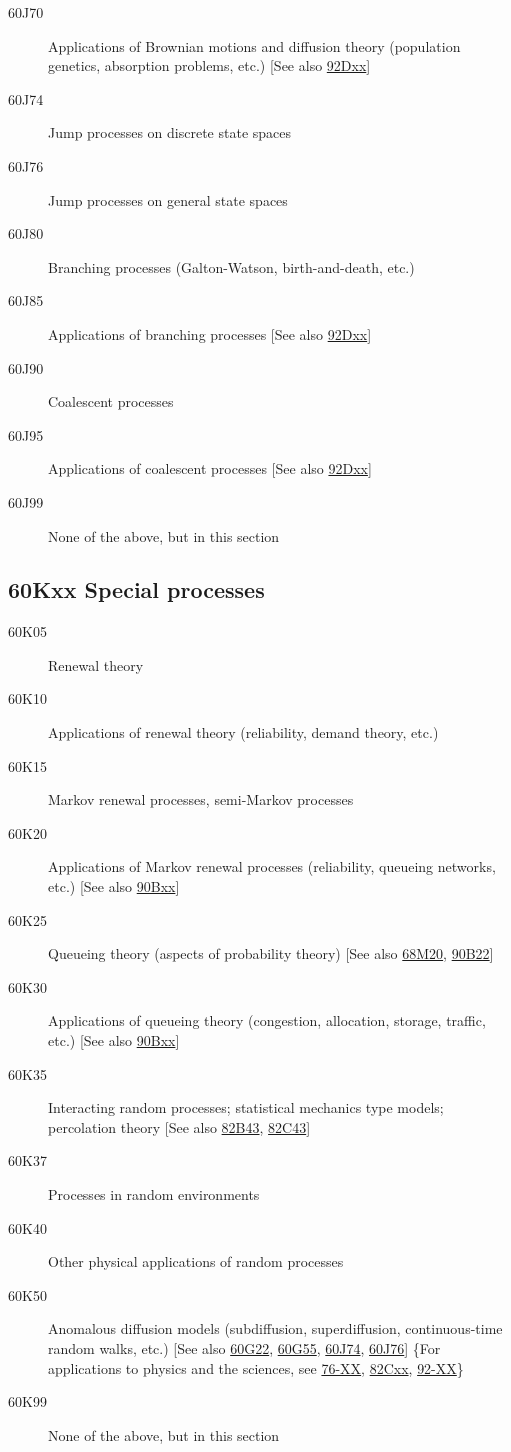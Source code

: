 \begin{description}
\item [60J70]\label{60J70} Applications of Brownian motions and diffusion theory (population genetics, absorption problems, etc.) [See also \hyperref[92Dxx]{92Dxx}]
\item [60J74]\label{60J74} Jump processes on discrete state spaces
\item [60J76]\label{60J76} Jump processes on general state spaces
\item [60J80]\label{60J80} Branching processes (Galton-Watson, birth-and-death, etc.)
\item [60J85]\label{60J85} Applications of branching processes [See also \hyperref[92Dxx]{92Dxx}]
\item [60J90]\label{60J90} Coalescent processes
\item [60J95]\label{60J95} Applications of coalescent processes [See also \hyperref[92Dxx]{92Dxx}]
\item [60J99]\label{60J99} None of the above, but in this section
\end{description}
\subsection*{60Kxx  Special processes }\label{60Kxx}
\begin{description}  
\item [60K05]\label{60K05} Renewal theory
\item [60K10]\label{60K10} Applications of renewal theory (reliability, demand theory, etc.)
\item [60K15]\label{60K15} Markov renewal processes, semi-Markov processes
\item [60K20]\label{60K20} Applications of Markov renewal processes (reliability, queueing networks, etc.) [See also \hyperref[90Bxx]{90Bxx}]
\item [60K25]\label{60K25} Queueing theory (aspects of probability theory) [See also \hyperref[68M20]{68M20}, \hyperref[90B22]{90B22}]
\item [60K30]\label{60K30} Applications of queueing theory (congestion, allocation, storage, traffic, etc.) [See also \hyperref[90Bxx]{90Bxx}]
\item [60K35]\label{60K35} Interacting random processes; statistical mechanics type models; percolation theory [See also \hyperref[82B43]{82B43}, \hyperref[82C43]{82C43}]
\item [60K37]\label{60K37} Processes in random environments
\item [60K40]\label{60K40} Other physical applications of random processes
\item [60K50]\label{60K50} Anomalous diffusion models (subdiffusion, superdiffusion, continuous-time random walks, etc.) [See also \hyperref[60G22]{60G22}, \hyperref[60G55]{60G55}, \hyperref[60J74]{60J74}, \hyperref[60J76]{60J76}] \{For applications to physics and the sciences, see \hyperref[76-XX]{76-XX}, \hyperref[82Cxx]{82Cxx}, \hyperref[92-XX]{92-XX}\}
\item [60K99]\label{60K99} None of the above, but in this section
\end{description}
